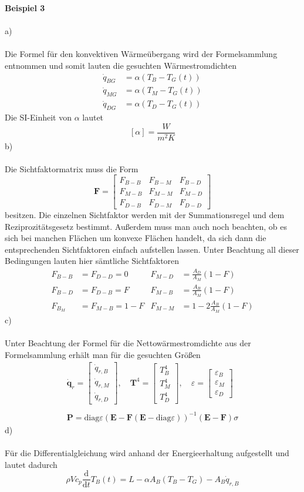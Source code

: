 \newpage
\noindent
\textbf{Beispiel 3}\\ \\
a)\\ \\
Die Formel für den konvektiven Wärmeübergang wird der Formelsammlung entnommen und somit lauten die gesuchten Wärmestromdichten
\begin{align*}
	\dot{q}_{BG} &= \alpha(T_B - T_G(t)) \\ 
	\dot{q}_{MG} &= \alpha(T_M - T_G(t)) \\
	\dot{q}_{DG} &= \alpha(T_D - T_G(t))
\end{align*}
Die SI-Einheit von $\alpha$ lautet
\[
	[\alpha] = \frac{W}{m^2K}
\]
b)\\ \\
Die Sichtfaktormatrix muss die Form
\[
	\textbf{F} = \begin{bmatrix}
		F_{B-B} & F_{B-M} & F_{B-D} \\
		F_{M-B} & F_{M-M} & F_{M-D} \\
		F_{D-B} & F_{D-M} & F_{D-D}
	\end{bmatrix}
\]
besitzen. Die einzelnen Sichtfaktor werden mit der Summationsregel und dem Reziprozitätsgesetz bestimmt. Außerdem muss man auch noch beachten, ob es sich bei manchen Flächen um konvexe Flächen handelt, da sich dann die entsprechenden Sichtfaktoren einfach aufstellen lassen. Unter Beachtung all dieser Bedingungen lauten hier sämtliche Sichtfaktoren
\begin{align*}
	F_{B-B} &= F_{D-D} = 0 & F_{M-D} &= \frac{A_D}{A_M}(1 - F) \\
	F_{B-D} &= F_{D-B} = F & F_{M-B} &= \frac{A_B}{A_M}(1 - F)\\
	F_{B_M} &= F_{M-B} = 1 - F & F_{M-M} &= 1 - 2\frac{A_B}{A_M}(1 - F)
\end{align*}
c)\\ \\
Unter Beachtung der Formel für die Nettowärmestromdichte aus der Formelsammlung erhält man für die gesuchten Größen
\begin{align*}
	 \dot{\textbf{q}}_r = \begin{bmatrix}
		\dot{q}_{r,B} \\
		\dot{q}_{r,M} \\
		\dot{q}_{r,D}
	\end{bmatrix}
	, \quad
	\textbf{T}^4 = \begin{bmatrix}
		T_B^4 \\
		T_M^4 \\
		T_D^4
	\end{bmatrix}
	, \quad
	\varepsilon = \begin{bmatrix}
		\varepsilon_B \\
		\varepsilon_M \\
		\varepsilon_D
	\end{bmatrix}
	\\ \\
	\textbf{P} = \text{diag}{\varepsilon}(\textbf{E} - \textbf{F}(\textbf{E} - \text{diag}{\varepsilon}))^{-1}(\textbf{E} - \textbf{F})\sigma
\end{align*}
d)\\ \\
Für die Differentialgleichung wird anhand der Energieerhaltung aufgestellt und lautet dadurch
\[
	\rho Vc_p\frac{\text{d}}{\text{d}t}T_B(t) = L - \alpha A_B(T_B - T_G) - A_B\dot{q}_{r,B}
\]